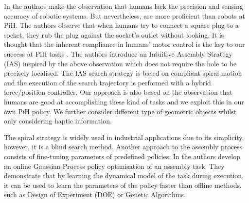 In \cite{intuitive_peg_isr_2013} the authors make the observation that humans lack the precision and sensing 
accuracy of robotic systems. But nevertheless, are more proficient than robots at PiH. The authors observe that when humans try to connect a square plug to a socket, they rub the plug against the socket's 
outlet without looking. It is thought that the inherent compliance in humans' motor control  
is the key to our success at PiH tasks \cite{compliant_manip_icra_2008}. 
The authors introduce an Intuitive Assembly Strategy (IAS) inspired by the above observation which 
does not require the hole to be precisely localised. The IAS search strategy is based on compliant 
spiral motion and the execution of the search trajectory is performed with a hybrid force/position controller.
Our approach is also based on the observation that humans are good at accomplishing these kind of tasks
and we exploit this in our own PiH policy. We further consider different type of geometric objects whilst 
only considering haptic information.

The spiral strategy is widely used in industrial applications due to its simplicity, 
however, it is a blind search method. Another approach to the assembly process 
consists of fine-tuning parameters of predefined policies. In \cite{online_gpr_icra_2014}
the authors develop an online Gaussian Process policy optimisation of an assembly task. They 
demonstrate that by learning the dynamical model of the task during execution, it can be used to 
learn the parameters of the policy faster than offline methods, such as Design of Experiment (DOE) 
or Genetic Algorithms.


